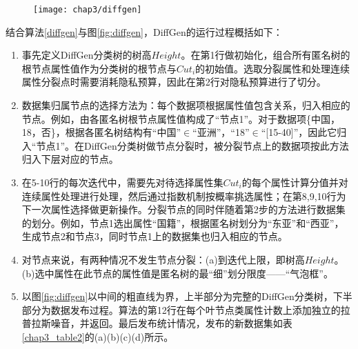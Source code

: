 \begin{figure}[!htp]
	\centering
	\texttt{[image: chap3/diffgen]}
\end{figure}

结合算法\ref{diffgen}与图\ref{fig:diffgen}，DiffGen的运行过程概括如下：

\begin{enumerate}
	\label{process}
	\item 事先定义DiffGen分类树的树高$Height$。在第1行做初始化，组合所有匿名树的根节点属性值作为分类树的根节点与$Cut_{i}$的初始值。选取分裂属性和处理连续属性分裂点时需要消耗隐私预算，因此在第2行对隐私预算进行了切分。
	\item 数据集归属节点的选择方法为：每个数据项根据属性值包含关系，归入相应的节点。例如，由各匿名树根节点属性值构成了“节点1”。对于数据项\{中国，18，否\}，根据各匿名树结构有“中国”$\in$“亚洲”，“18”$\in$“[15-40]”，因此它归入“节点1”。在DiffGen分类树做节点分裂时，被分裂节点上的数据项按此方法归入下层对应的节点。
	\item 在5-10行的每次迭代中，需要先对待选择属性集$Cut_{i}$的每个属性计算分值并对连续属性处理进行处理，然后通过指数机制按概率挑选属性；在第8,9,10行为下一次属性选择做更新操作。分裂节点的同时伴随着第2步的方法进行数据集的划分。例如，节点1选出属性“国籍”，根据匿名树划分为“东亚”和“西亚”，生成节点2和节点3，同时节点1上的数据集也归入相应的节点。
	\item 对节点来说，有两种情况不发生节点分裂：(a)到迭代上限，即树高$Height$。(b)选中属性在此节点的属性值是匿名树的最“细”划分限度——“气泡框”。
	\item 以图\ref{fig:diffgen}以中间的粗直线为界，上半部分为完整的DiffGen分类树，下半部分为数据发布过程。算法的第12行在每个叶节点类属性计数上添加独立的拉普拉斯噪音，并返回。最后发布统计情况，发布的新数据集如表\ref{chap3_table2}的(a)(b)(c)(d)所示。
\end{enumerate}

